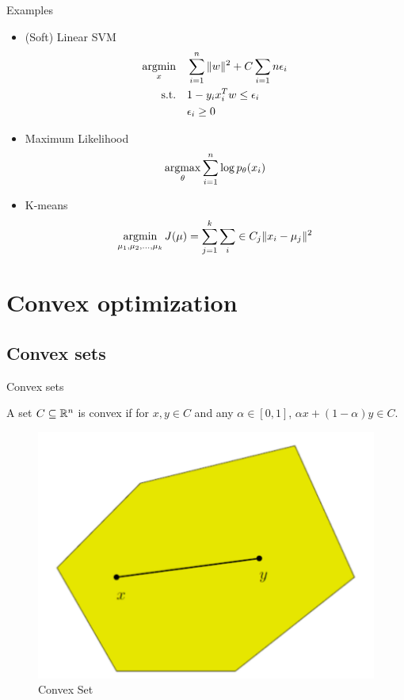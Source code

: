 \documentclass[draft]{beamer}
\begin{document}
\begin{frame}{Examples} 
	\begin{itemize} 
		\item (Soft) Linear SVM 
		\begin{equation}
			\begin{aligned}
				\mathop{\mathrm{argmin}}_x \quad & \sum_{i=1}^{n} \|w\|^2 + C \sum_{i=1}{n} \epsilon_i  \\ 
				\textrm{s.t.} \quad & 1-y_ix_i^Tw\le \epsilon_i \\  
				 		\quad & \epsilon_i \ge 0 \\ 
			\end{aligned}
		\end{equation}
		\item Maximum Likelihood 
		\begin{equation}
			\mathop{\mathrm{argmax}}_\theta \sum_{i=1}^{n} \log p_\theta (x_i)
		\end{equation}
		\item K-means 
		\begin{equation}
			\mathop{\mathrm{argmin}}_{\mu_1,\mu_2,...,\mu_k} J(\mu) = \sum_{j=1}^{k} \sum_i\in C_j \|x_i-\mu_j\|^2 
		\end{equation}
	\end{itemize}
\end{frame}

\section{Convex optimization} 
\subsection{Convex sets} 

\begin{frame}{Convex sets}
\begin{define}
A set $C \subseteq {\mathbb{R}}^n$ is convex if for $x,y \in C$ and any $\alpha \in [0,1]$, $\alpha x +(1-\alpha)y \in C$. 
\end{define}
\begin{figure}
\includegraphics[width=.45\textwidth]{2018-03-04-21-52-01.png} 
\caption{Convex Set}
\end{figure}

\end{frame}
\end{document}

